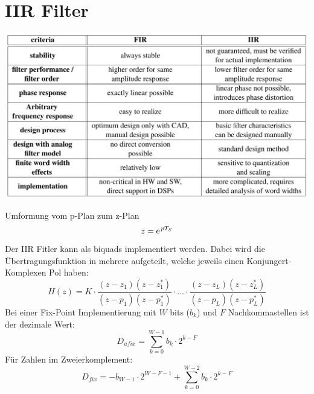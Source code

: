 \section{IIR Filter}
\begin{center}
	\includegraphics[scale=.7]{../fig/fir_vs_iir}
\end{center}
Umformung vom p-Plan zum z-Plan
\[ z = \e^{pT_S} \]
Der IIR Fitler kann als biquads implementiert werden. Dabei wird die
Übertragungsfunktion in mehrere aufgeteilt, welche jeweils einen Konjungert-
Komplexen Pol haben:
\[ H(z) = K \cdot \frac{(z-z_1)(z-z_1^*)}{(z-p_1)(z-p_1^*)}\cdot\ldots\cdot
	\frac{(z-z_L)(z-z_L^*)}{(z-p_L)(z-p_L^*)} \]
Bei einer Fix-Point Implementierung mit $W$ bits ($b_k$) und $F$ Nachkommastellen ist
der dezimale Wert:
\[ D_{ufix} = \sum_{k=0}^{W-1}b_k \cdot 2^{k-F} \]
Für Zahlen im Zweierkomplement:
\[ D_{fix} = -b_{W-1} \cdot 2^{W-F-1} + \sum_{k=0}^{W-2} b_k \cdot 2^{k-F} \]

